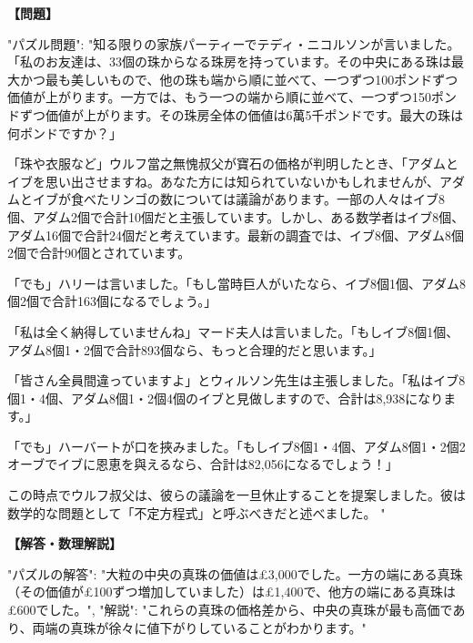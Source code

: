 \documentclass[10pt,a4paper,oneside,openany]{ltjsbook}
\begin{document}
\begin{tcolorbox}[colback=softblue,colframe=primaryblue,title=\textbf{第 99 問：THE THIRTY-THREE PEARLS.},arc=2mm,boxrule=1pt,breakable]
\textbf{【問題】}\par\vspace{0.3em}
{
"パズル問題": "知る限りの家族パーティーでテディ・ニコルソンが言いました。「私のお友達は、33個の珠からなる珠房を持っています。その中央にある珠は最大かつ最も美しいもので、他の珠も端から順に並べて、一つずつ100ポンドずつ価値が上がります。一方では、もう一つの端から順に並べて、一つずつ150ポンドずつ価値が上がります。その珠房全体の価値は6萬5千ポンドです。最大の珠は何ポンドですか？」

「珠や衣服など」ウルフ當之無愧叔父が寶石の価格が判明したとき、「アダムとイブを思い出させますね。あなた方には知られていないかもしれませんが、アダムとイブが食べたリンゴの数については議論があります。一部の人々はイブ8個、アダム2個で合計10個だと主張しています。しかし、ある数学者はイブ8個、アダム16個で合計24個だと考えています。最新の調査では、イブ8個、アダム8個2個で合計90個とされています。

「でも」ハリーは言いました。「もし當時巨人がいたなら、イブ8個1個、アダム8個2個で合計163個になるでしょう。」

「私は全く納得していませんね」マード夫人は言いました。「もしイブ8個1個、アダム8個1・2個で合計893個なら、もっと合理的だと思います。」

「皆さん全員間違っていますよ」とウィルソン先生は主張しました。「私はイブ8個1・4個、アダム8個1・2個4個のイブと見做しますので、合計は8,938になります。」

「でも」ハーバートが口を挾みました。「もしイブ8個1・4個、アダム8個1・2個2オーブでイブに恩恵を與えるなら、合計は82,056になるでしょう！」

この時点でウルフ叔父は、彼らの議論を一旦休止することを提案しました。彼は数学的な問題として「不定方程式」と呼ぶべきだと述べました。
"
}
\tcblower
\textbf{【解答・数理解説】}\par\vspace{0.3em}
{
"パズルの解答": "大粒の中央の真珠の価値は£3,000でした。一方の端にある真珠（その価値が£100ずつ増加していました）は£1,400で、他方の端にある真珠は£600でした。",
"解説": "これらの真珠の価格差から、中央の真珠が最も高価であり、両端の真珠が徐々に値下がりしていることがわかります。"
}
\end{tcolorbox}
\end{document}
